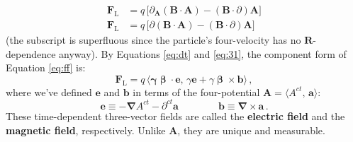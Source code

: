 \documentclass[12pt]{article}
\renewcommand{\vv}[1]{\mathbf{#1}}
\newcommand{\vvbeta}{\bm{\upbeta}}
\newcommand{\del}{\boldsymbol{\nabla}}
\begin{document}
\begin{equation}\label{eq:lff}
\begin{split}
\vv F_{\textrm{L}} &= q \, \bigl[ \partialup_{\vv A} (\vv B \cdot \vv A) - (\vv B \cdot \partialup) \vv A \bigr] \\
\vv F_{\textrm{L}} &= q \, \bigl[ \partialup (\vv B \cdot \vv A) - (\vv B \cdot \partialup) \vv A \bigr] 
\end{split}
\end{equation}
(the subscript is superfluous since the particle's four-velocity has no $\vv R$-dependence anyway). By Equations \ref{eq:dt} and \ref{eq:31}, the component form of Equation \ref{eq:ff} is:
\begin{equation}\label{eq:lfc}
\boxed{ \vv F_{\textrm{L}} = q \, \big \langle \vv \gamma \vvbeta \cdot \vv e , \, \gamma \vv e + \gamma \vvbeta \times \vv b \big \rangle } \, ,
\end{equation}
where we've defined $\vv e$ and $\vv b$ in terms of the four-potential $\vv A = \langle A^{ct}, \, \vv a \rangle$:
\begin{equation}\label{eq:eb}
\boxed{ \vv e \equiv - \del A^{ct} - \partial^{ct} \vv a \qquad \qquad \vv b \equiv \del \times \vv a } \, .
\end{equation}
These time-dependent three-vector fields are called the \textbf{electric field} and the \textbf{magnetic field}, respectively. Unlike $\vv A$, they are unique and measurable.
\end{document}

